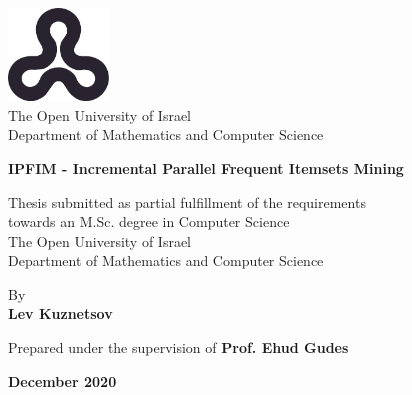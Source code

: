 \begin{titlepage}
    \begin{center}
        \vspace*{1cm}
        
        \includegraphics[width=0.2\textwidth]{ou_logo.png}\\
        The Open University of Israel\\
        Department of Mathematics and Computer Science
        
        \vspace{2cm}
        
        {\Large \textbf{IPFIM - Incremental Parallel Frequent Itemsets Mining}}
        \vspace{1.5cm}
        
        Thesis submitted as partial fulfillment of the requirements\\towards an M.Sc. degree in Computer Science\\
        The Open University of Israel\\
        Department of Mathematics and Computer Science
        
        \vspace{1cm}
        
        By \\
        \textbf{Lev Kuznetsov}
        
        \vspace{1cm}
        
        Prepared under the supervision of \textbf{Prof. Ehud Gudes}
        
        \vfill
        
        \textbf{December 2020}
    \end{center}
\end{titlepage}